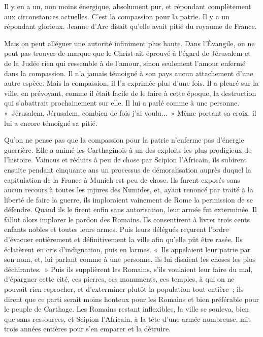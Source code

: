 \documentclass[french,twoside]{book} %
\begin{document}
Il y en a un, non moins énergique, absolument pur, et répondant complètement aux circonstances actuelles. C'est la compassion pour la patrie. Il y a un répondant glorieux. Jeanne d'Arc disait qu'elle avait pitié du royaume de France.\par
Mais on peut alléguer une autorité infiniment plus haute. Dans l'Évangile, on ne peut pas trouver de marque que le Christ ait éprouvé à l'égard de Jérusalem et de la Judée rien qui ressemble à de l'amour, sinon seulement l'amour enfermé dans la compassion. Il n'a jamais témoigné à son pays aucun attachement d'une autre espèce. Mais la compassion, il l'a exprimée plus d'une fois. Il a pleuré sur la ville, en prévoyant, comme il était facile de le faire à cette époque, la destruction qui s'abattrait prochainement sur elle. Il lui a parlé comme à une personne. « Jérusalem, Jérusalem, combien de fois j'ai voulu... » Même portant sa croix, il lui a encore témoigné sa pitié.\par
Qu'on ne pense pas que la compassion pour la patrie n'enferme pas d'énergie guerrière. Elle a animé les Carthaginois à un des exploits les plus prodigieux de l'histoire. Vaincus et réduits à peu de chose par Scipion l'Africain, ils subirent ensuite pendant cinquante ans un processus de démoralisation auprès duquel la capitulation de la France à Munich est peu de chose. Ils furent exposés sans aucun recours à toutes les injures des Numides, et, ayant renoncé par traité à la liberté de faire la guerre, ils imploraient vainement de Rome la permission de se défendre. Quand ils le firent enfin sans autorisation, leur armée fut exterminée. Il fallut alors implorer le pardon des Romains. Ils consentirent à livrer trois cents enfants nobles et toutes leurs armes. Puis leurs délégués reçurent l'ordre d'évacuer entièrement et définitivement la ville afin qu'elle pût être rasée. Ils éclatèrent en cris d'indignation, puis en larmes. « Ils appelaient leur patrie par son nom, et, lui parlant comme à une personne, ils lui disaient les choses les plus déchirantes. » Puis ils supplièrent les Romains, s'ils voulaient leur faire du mal, d'épargner cette cité, ces pierres, ces monuments, ces temples, à qui on ne pouvait rien reprocher, et d'exterminer plutôt la population tout entière ; ils dirent que ce parti serait moins honteux pour les Romains et bien préférable pour le peuple de Carthage. Les Romains restant inflexibles, la ville se souleva, bien que sans ressources, et Scipion l'Africain, à la tête d'une armée nombreuse, mit trois années entières pour s'en emparer et la détruire.\par
\end{document}
